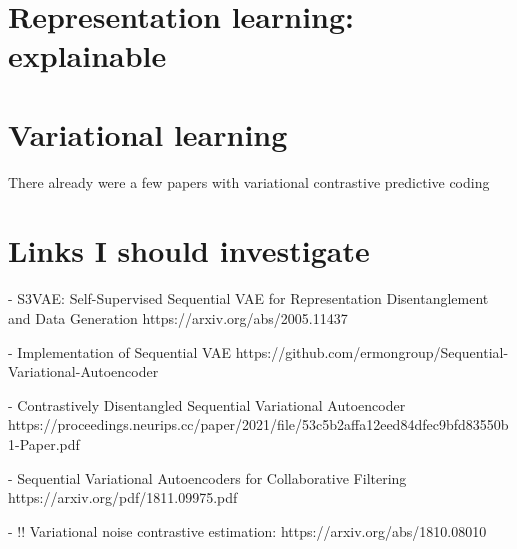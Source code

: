 




\section{Representation learning: explainable}
\section{Variational learning}
There already were a few papers with variational contrastive predictive coding

\section{Links I should investigate}
- S3VAE: Self-Supervised Sequential VAE for Representation Disentanglement and Data Generation
https://arxiv.org/abs/2005.11437

- Implementation of Sequential VAE
https://github.com/ermongroup/Sequential-Variational-Autoencoder

- Contrastively Disentangled Sequential Variational Autoencoder
https://proceedings.neurips.cc/paper/2021/file/53c5b2affa12eed84dfec9bfd83550b1-Paper.pdf

- Sequential Variational Autoencoders for Collaborative Filtering
https://arxiv.org/pdf/1811.09975.pdf

- !! Variational noise contrastive estimation:
https://arxiv.org/abs/1810.08010